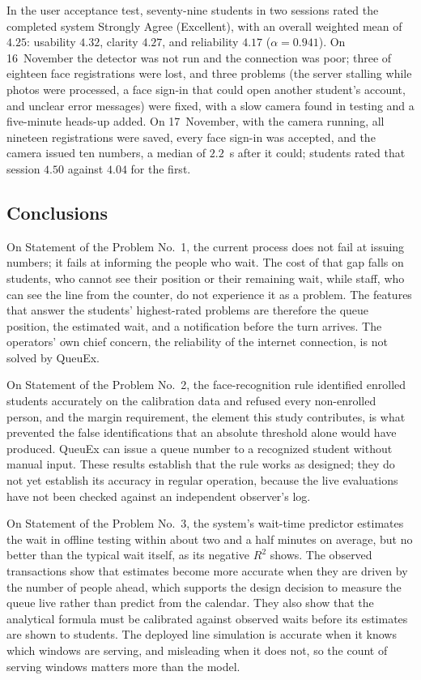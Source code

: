 \documentclass{research}
\newcommand{\sysname}{QueuEx}
\begin{document}
In the user acceptance test, seventy-nine students in two sessions rated
the completed system Strongly Agree (Excellent), with an overall
weighted mean of $4.25$: usability $4.32$, clarity $4.27$, and
reliability $4.17$ ($\alpha = 0.941$). On 16~November the detector was
not run and the connection was poor; three of eighteen face
registrations were lost, and three problems (the server stalling
while photos were processed, a face sign-in that could open another
student's account, and unclear error messages) were fixed, with a
slow camera found in testing and a five-minute heads-up added. On
17~November, with the camera running, all nineteen registrations were
saved, every face sign-in was accepted, and the camera issued ten
numbers, a median of $2.2$~s after it could; students rated that session
$4.50$ against $4.04$ for the first.

\subsection{Conclusions}
\label{sec:conclusions}

On Statement of the Problem No.~1, the current process does not fail at
issuing numbers; it fails at informing the people who wait. The cost of
that gap falls on students, who cannot see their position or their
remaining wait, while staff, who can see the line from the counter, do
not experience it as a problem. The features that answer the students'
highest-rated problems are therefore the queue position, the estimated
wait, and a notification before the turn arrives. The operators' own
chief concern, the reliability of the internet connection, is not
solved by \sysname{}.

On Statement of the Problem No.~2, the face-recognition rule identified
enrolled students accurately on the calibration data and refused every
non-enrolled person, and the margin requirement, the element this study
contributes, is what prevented the false identifications that an
absolute threshold alone would have produced. \sysname{} can issue a
queue number to a recognized student without manual input. These results
establish that the rule works as designed; they do not yet establish its
accuracy in regular operation, because the live evaluations have not
been checked against an independent observer's log.

On Statement of the Problem No.~3, the system's wait-time predictor
estimates the wait in offline testing within about two and a half
minutes on average, but no better than the typical wait itself, as its
negative $R^2$ shows. The observed transactions show that estimates
become more accurate when they are driven by the number of people ahead,
which supports the design decision to measure the queue live rather than
predict from the calendar. They also show that the analytical formula
must be calibrated against observed waits before its estimates are shown
to students. The deployed line simulation is accurate when it knows
which windows are serving, and misleading when it does not, so the count
of serving windows matters more than the model.
\end{document}
